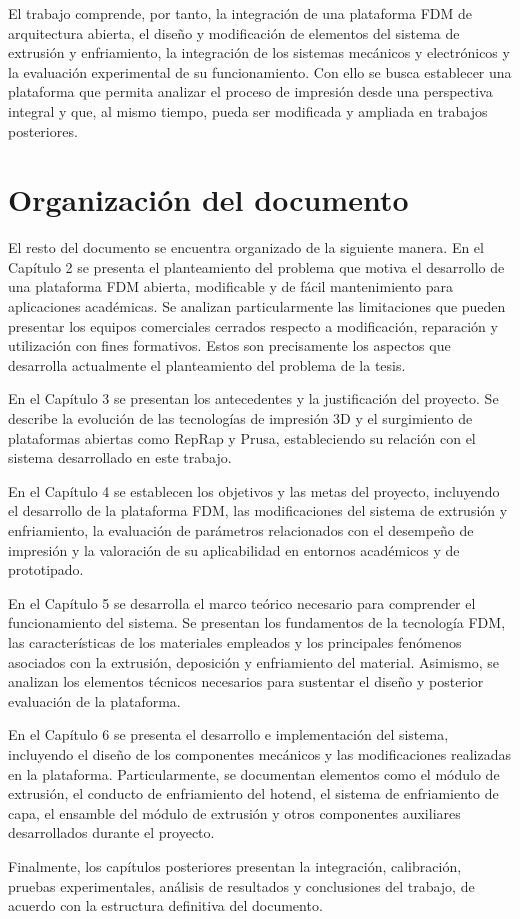 El trabajo comprende, por tanto, la integración de una plataforma FDM de arquitectura abierta, el diseño y modificación de elementos del sistema de extrusión y enfriamiento, la integración de los sistemas mecánicos y electrónicos y la evaluación experimental de su funcionamiento. Con ello se busca establecer una plataforma que permita analizar el proceso de impresión desde una perspectiva integral y que, al mismo tiempo, pueda ser modificada y ampliada en trabajos posteriores.

\section{Organización del documento}

El resto del documento se encuentra organizado de la siguiente manera. En el Capítulo 2 se presenta el planteamiento del problema que motiva el desarrollo de una plataforma FDM abierta, modificable y de fácil mantenimiento para aplicaciones académicas. Se analizan particularmente las limitaciones que pueden presentar los equipos comerciales cerrados respecto a modificación, reparación y utilización con fines formativos. Estos son precisamente los aspectos que desarrolla actualmente el planteamiento del problema de la tesis.

En el Capítulo 3 se presentan los antecedentes y la justificación del proyecto. Se describe la evolución de las tecnologías de impresión 3D y el surgimiento de plataformas abiertas como RepRap y Prusa, estableciendo su relación con el sistema desarrollado en este trabajo.   

En el Capítulo 4 se establecen los objetivos y las metas del proyecto, incluyendo el desarrollo de la plataforma FDM, las modificaciones del sistema de extrusión y enfriamiento, la evaluación de parámetros relacionados con el desempeño de impresión y la valoración de su aplicabilidad en entornos académicos y de prototipado.

En el Capítulo 5 se desarrolla el marco teórico necesario para comprender el funcionamiento del sistema. Se presentan los fundamentos de la tecnología FDM, las características de los materiales empleados y los principales fenómenos asociados con la extrusión, deposición y enfriamiento del material. Asimismo, se analizan los elementos técnicos necesarios para sustentar el diseño y posterior evaluación de la plataforma.

En el Capítulo 6 se presenta el desarrollo e implementación del sistema, incluyendo el diseño de los componentes mecánicos y las modificaciones realizadas en la plataforma. Particularmente, se documentan elementos como el módulo de extrusión, el conducto de enfriamiento del hotend, el sistema de enfriamiento de capa, el ensamble del módulo de extrusión y otros componentes auxiliares desarrollados durante el proyecto.

Finalmente, los capítulos posteriores presentan la integración, calibración, pruebas experimentales, análisis de resultados y conclusiones del trabajo, de acuerdo con la estructura definitiva del documento.

